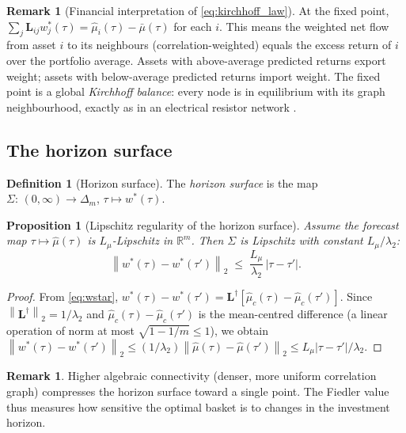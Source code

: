 \documentclass[twocolumn,11pt,a4paper]{article}
\theoremstyle{plain}
\newtheorem{proposition}[theorem]{Proposition}
\theoremstyle{definition}
\newtheorem{definition}[theorem]{Definition}
\newtheorem{remark}[theorem]{Remark}
\theoremstyle{remark}
\newcommand{\R}{\mathbb{R}}
\newcommand{\Lop}{\mathbf{L}}        %
\newcommand{\Lpinv}{\mathbf{L}^{\dagger}} %
\newcommand{\wstar}{w^{*}}
\newcommand{\Deltam}{\Delta_m}
\newcommand{\lamtwo}{\lambda_2}
\newcommand{\norm}[1]{\left\|#1\right\|}
\newcommand{\abs}[1]{\left|#1\right|}
\begin{document}
\begin{remark}[Financial interpretation of \eqref{eq:kirchhoff_law}]
  At the fixed point, $\sum_j\Lop_{ij}w^*_j(\tau)=\hat\mu_i(\tau)-\bar\mu(\tau)$
  for each $i$.  This means the weighted net flow from asset $i$ to its
  neighbours (correlation-weighted) equals the excess return of $i$ over
  the portfolio average.  Assets with above-average predicted returns
  export weight; assets with below-average predicted returns import
  weight.  The fixed point is a global \emph{Kirchhoff balance}: every
  node is in equilibrium with its graph neighbourhood, exactly as in an
  electrical resistor network \cite{Kirchhoff1847}.
\end{remark}

\subsection{The horizon surface}
\label{sec:horizonsurface}

\begin{definition}[Horizon surface]
  The \emph{horizon surface} is the map
  $\Sigma:\,(0,\infty)\to\Deltam$, $\tau\mapsto\wstar(\tau)$.
\end{definition}

\begin{proposition}[Lipschitz regularity of the horizon surface]
  \label{prop:lipschitz}
  Assume the forecast map $\tau\mapsto\hat\mu(\tau)$ is
  $L_\mu$-Lipschitz in $\R^m$.  Then $\Sigma$ is Lipschitz with
  constant $L_\mu/\lamtwo$:
  \begin{equation}
    \norm{\wstar(\tau)-\wstar(\tau')}_2
    \;\le\; \frac{L_\mu}{\lamtwo}\,\abs{\tau-\tau'}.
    \label{eq:horizon_lipschitz}
  \end{equation}
\end{proposition}

\begin{proof}
  From \eqref{eq:wstar},
  $\wstar(\tau)-\wstar(\tau')=\Lpinv[\hat\mu_c(\tau)-\hat\mu_c(\tau')]$.
  Since $\norm{\Lpinv}_2=1/\lamtwo$ and $\hat\mu_c(\tau)-\hat\mu_c(\tau')$
  is the mean-centred difference (a linear operation of norm at most
  $\sqrt{1-1/m}\le 1$), we obtain
  $\norm{\wstar(\tau)-\wstar(\tau')}_2\le
  (1/\lamtwo)\norm{\hat\mu(\tau)-\hat\mu(\tau')}_2\le
  L_\mu|\tau-\tau'|/\lamtwo$.
\end{proof}

\begin{remark}
  Higher algebraic connectivity (denser, more uniform correlation graph)
  compresses the horizon surface toward a single point.  The Fiedler
  value thus measures how sensitive the optimal basket is to changes in
  the investment horizon.
\end{remark}
\end{document}
